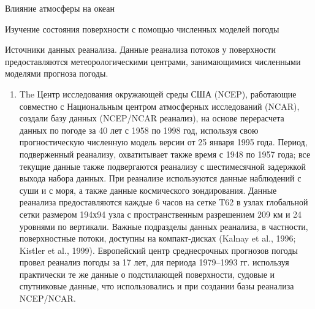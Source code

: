 \begin{chapter}{Влияние атмосферы на океан}
\begin{section}{Изучение состояния поверхности с помощью численных моделей погоды}
\begin{paragraph}{Источники данных реанализа.}
Данные реанализа потоков у поверхности предоставляются
метеорологическими центрами, занимающимися численными моделями
прогноза погоды.
%

\begin{enumerate}
\item
The Центр исследования окружающей среды США (NCEP), работающие
совместно с Национальным центром атмосферных исследований (NCAR),
создали базу данных (NCEP/NCAR реанализ), на основе перерасчета данных
по погоде за 40 лет с 1958 по 1998 год, используя свою прогностическую
численную модель версии от 25 января 1995 года. Период, подверженный
реанализу, охватитывает также время с 1948 по 1957 года; все текущие
данные также подвергаются реанализу с шестимесячной задержкой выхода
набора данных. При реанализе используются данные наблюдений с суши и с
моря, а также данные космического зондирования. Данные реанализа
предоставляются каждые 6 часов на сетке T62 в узлах глобальной сетки
размером 194х94 узла с пространственным разрешением 209 км и 24
уровнями по вертикали. Важные подразделы данных реанализа, в
частности, поверхностные потоки, доступны на компакт-дисках (Kalnay et
al., 1996; Kistler et al., 1999). Европейский центр среднесрочных
прогнозов погоды провел реанализ погоды за 17 лет, для периода
1979–1993 гг. используя практически те же данные о подстилающей
поверхности, судовые и спутниковые данные, что использовались и при
создании базы реанализа NCEP/NCAR.
%


\end{enumerate}
\end{paragraph}
\end{section}
\end{chapter}

